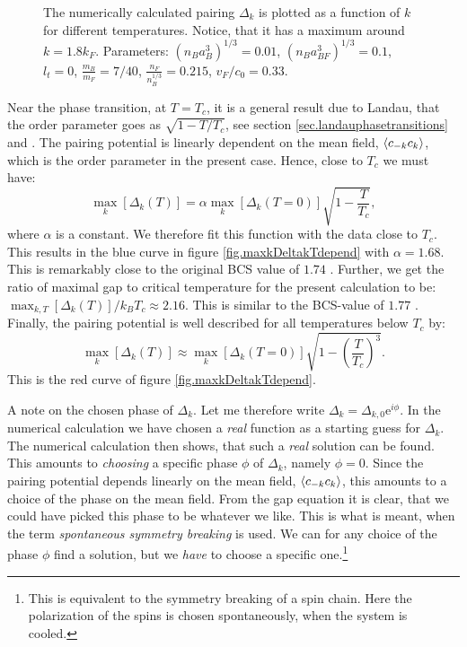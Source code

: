 \begin{figure} 
\begin{center}  
  
\caption{The numerically calculated pairing $\Delta_k$ is plotted as a function of $k$ for different temperatures. Notice, that it has a maximum around $k = 1.8 k_F$. Parameters: $(n_Ba_B^3)^{1/3} = 0.01$, $(n_Ba_{BF}^3)^{1/3} = 0.1$, $l_t = 0$, $\frac{m_B}{m_F} = 7/40$, $\frac{n_F}{n_B^{1/3}} = 0.215$, $v_F/c_0 = 0.33$. }  
\label{fig.Deltakkdepend}  
\end{center}    
\end{figure}

Near the phase transition, at $T = T_c$, it is a general result due to Landau, that the order parameter goes as $\sqrt{1 - T/T_c}$, see section \ref{sec.landauphasetransitions} and \cite[86-87]{PlischkeStatPhys}. The pairing potential is linearly dependent on the mean field, $\braket{c_{-k}c_k}$, which is the order parameter in the present case. Hence, close to $T_c$ we must have:
\begin{equation}
\max_k[\Delta_k(T)] = \alpha\max_k[\Delta_k(T=0)]\sqrt{1 - \frac{T}{T_c}},  
\label{eq.maxpairingasymp}
\end{equation}
where $\alpha$ is a constant. We therefore fit this function with the data close to $T_c$. This results in the blue curve in figure \ref{fig.maxkDeltakTdepend} with $\alpha = 1.68$. This is remarkably close to the original BCS value of $1.74$ \cite[p. 369]{PlischkeStatPhys}. Further, we get the ratio of maximal gap to critical temperature for the present calculation to be: $\max_{k,T}[\Delta_k(T)]/k_B T_c \approx 2.16$. This is similar to the BCS-value of $1.77$ \cite[p. 369]{PlischkeStatPhys}. Finally, the pairing potential is well described for all temperatures below $T_c$ by:
\begin{equation}
\max_k[\Delta_k(T)] \approx \max_k[\Delta_k(T=0)]\sqrt{1 - \left(\frac{T}{T_c}\right)^3}.
\label{eq.maxpairingapprox}
\end{equation} 
This is the red curve of figure \ref{fig.maxkDeltakTdepend}. 

A note on the chosen phase of $\Delta_k$. Let me therefore write $\Delta_k = \Delta_{k,0}\text{e}^{i\phi}$. In the numerical calculation we have chosen a \textit{real} function as a starting guess for $\Delta_k$. The numerical calculation then shows, that such a \textit{real} solution can be found. This amounts to \textit{choosing} a specific phase $\phi$ of $\Delta_k$, namely $\phi = 0$. Since the pairing potential depends linearly on the mean field, $\braket{c_{-k}c_k}$, this amounts to a choice of the phase on the mean field. From the gap equation it is clear, that we could have picked this phase to be whatever we like. This is what is meant, when the term \textit{spontaneous symmetry breaking} is used. We can for any choice of the phase $\phi$ find a solution, but we \textit{have} to choose a specific one.\footnote{This is equivalent to the symmetry breaking of a spin chain. Here the polarization of the spins is chosen spontaneously, when the system is cooled.} 

